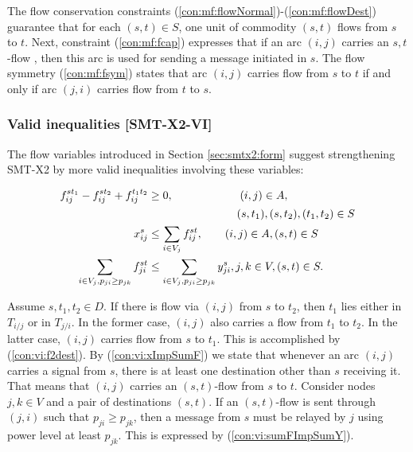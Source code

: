The flow conservation constraints (\ref{con:mf:flowNormal})-(\ref{con:mf:flowDest}) guarantee that for each $(s,t)\in S$, one unit of commodity $(s,t)$ flows from $s$ to $t$. Next, constraint (\ref{con:mf:fcap}) expresses that if an arc $(i,j)$ carries an $s,t$-flow , then this arc is used for sending a message initiated in $s$. The flow symmetry (\ref{con:mf:fsym}) states that arc $(i,j)$ carries flow from $s$ to $t$ if and only if arc $(j,i)$ carries flow from $t$ to $s$.

\subsubsection{Valid inequalities [SMT-X2-VI]}

The flow variables introduced in Section \ref{sec:smtx2:form} suggest strengthening SMT-X2 by more valid inequalities involving these variables:

  \begin{subequations}[resume]
  \begin{flalign}
\label{con:vi:f2dest}  f^{st_1}_{ij}-f^{st_2}_{ij}+f^{t_1t_2}_{ij} & \geq 0, \quad\quad\quad\quad\quad\quad (i,j) \in A, \\  & \notag\quad\quad\quad\quad\quad\quad\quad\quad(s,t_1),(s,t_2),(t_1,t_2)\in S \\
\label{con:vi:xImpSumF} x^{s}_{ij} & \leq \sum\limits_{i\in V_j}  f^{st}_{ij},   \quad\quad   (i,j)\in A, (s,t)\in S \\
\label{con:vi:sumFImpSumY} \sum\limits_{i\in V_j, p_{ji}\geq p_{jk}  }f^{st}_{ji} & \leq \sum\limits_{i\in V_j, p_{ji}\geq p_{jk}}  y^{s}_{ji},   j,k\in V, (s,t)\in S.
\end{flalign}
  \end{subequations}
  
Assume $s,t_1,t_2\in D$. If there is flow via $(i,j)$ from $s$ to $t_2$, then $t_1$ lies either in $T_{i/j}$ or in $T_{j/i}$. In the former case, $(i,j)$ also carries a flow from $t_1$ to $t_2$. In the latter case, $(i,j)$ carries flow from $s$ to $t_1$. This is accomplished by (\ref{con:vi:f2dest}). By (\ref{con:vi:xImpSumF}) we state that whenever an arc $(i,j)$ carries a signal from $s$, there is at least one destination other than $s$ receiving it. That means that $(i,j)$ carries an $(s,t)$-flow from $s$ to $t$.  Consider nodes $j,k\in V$ and a pair of destinations $(s,t)$. If an $(s,t)$-flow is sent through $(j,i)$ such that $p_{ji}\geq p_{jk}$, then a message from $s$ must be relayed by $j$ using power level at least $p_{jk}$. This is expressed by (\ref{con:vi:sumFImpSumY}).
